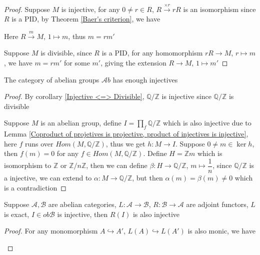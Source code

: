 \documentclass[../main.tex]{subfiles}
\begin{document}
\begin{proof}
Suppose $M$ is injective, for any $0\neq r\in R$, $R\xrightarrow{\times r}rR$ is an isomorphism since $R$ is a PID, by Theorem \ref{Baer's criterion}, we have
\begin{center}
\end{center}
Here $R\xrightarrow{m} M$, $1\mapsto m$, thus $m=rm'$ \par
Suppose $M$ is divisible, since $R$ is a PID, for any homomorphism $rR\to M$, $r\mapsto m$, we have $m=rm'$ for some $m'$, giving the extension $R\to M$, $1\mapsto m'$
\end{proof}

\begin{corollary}
The category of abelian groups $\mathscr Ab$ has enough injectives
\end{corollary}

\begin{proof}
By corollary \ref{Injective <=> Divisible}, $\mathbb Q/\mathbb Z$ is injective since $\mathbb Q/\mathbb Z$ is divisible \par
Suppose $M$ is an abelian group, define $I=\prod_{f}\mathbb Q/\mathbb Z$ which is also injective due to Lemma \ref{Coproduct of projetives is projective, product of injectives is injective}, here $f$ runs over $Hom(M,\mathbb Q/\mathbb Z)$, thus we get $h:M\to I$. Suppose $0\neq m\in\ker h$, then $f(m)=0$ for any $f\in Hom(M,\mathbb Q/\mathbb Z)$. Define $H=\mathbb Z m$ which is isomorphism to $\mathbb Z$ or $\mathbb Z/n\mathbb Z$, then we can define $\beta:H\to\mathbb Q/\mathbb Z$, $m\mapsto\dfrac{1}{n}$, since $\mathbb Q/\mathbb Z$ is a injective, we can extend to $\alpha:M\to\mathbb Q/\mathbb Z$, but then $\alpha(m)=\beta(m)\neq0$ which is a contradiction
\end{proof}

\begin{theorem}
Suppose $\mathscr A,\mathscr B$ are abelian categories, $L:\mathscr A\to\mathscr B$, $R:\mathscr B\to\mathscr A$ are adjoint functors, $L$ is exact, $I\in ob\mathscr B$ is injective, then $R(I)$ is also injective
\end{theorem}

\begin{proof}
For any monomorphism $A\hookrightarrow A'$, $L(A)\hookrightarrow L(A')$ is also monic, we have
\begin{center}
\end{center}
\end{proof}
\end{document}
